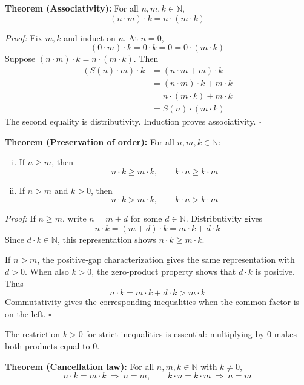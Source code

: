 \documentclass[a4paper,11pt,abstracton]{scrartcl}
\newcommand{\NN}{\mathbb{N}}
\newcommand{\rimply}{\Rightarrow}
\theoremstyle{dotlessP}
\theoremstyle{dotlessS}
\theoremstyle{remark}
\theoremstyle{definition}
\begin{document}
\begin{problem_box}
\textbf{Theorem (Associativity):}
For all $n,m,k\in\NN$,
\[
    (n\cdot m)\cdot k=n\cdot(m\cdot k)
\]
\end{problem_box}

\begin{claim_box}
\textit{Proof:}
Fix $m,k$ and induct on $n$. At $n=0$,
\[
    (0\cdot m)\cdot k=0\cdot k=0=0\cdot(m\cdot k)
\]
Suppose $(n\cdot m)\cdot k=n\cdot(m\cdot k)$. Then
\[
\begin{aligned}
    (S(n)\cdot m)\cdot k
    &=(n\cdot m+m)\cdot k\\
    &=(n\cdot m)\cdot k+m\cdot k\\
    &=n\cdot(m\cdot k)+m\cdot k\\
    &=S(n)\cdot(m\cdot k)
\end{aligned}
\]
The second equality is distributivity. Induction proves associativity.
\hfill$\square$
\end{claim_box}

\begin{problem_box}
\textbf{Theorem (Preservation of order):}
For all $n,m,k\in\NN$:
\begin{enumerate}[(i)]
    \item If $n\ge m$, then
    \[
        n\cdot k\ge m\cdot k,
        \qquad k\cdot n\ge k\cdot m
    \]
    \item If $n>m$ and $k>0$, then
    \[
        n\cdot k>m\cdot k,
        \qquad k\cdot n>k\cdot m
    \]
\end{enumerate}
\end{problem_box}

\begin{claim_box}
\textit{Proof:}
If $n\ge m$, write $n=m+d$ for some $d\in\NN$. Distributivity gives
\[
    n\cdot k=(m+d)\cdot k=m\cdot k+d\cdot k
\]
Since $d\cdot k\in\NN$, this representation shows
$n\cdot k\ge m\cdot k$.

If $n>m$, the positive-gap characterization gives the same
representation with $d>0$. When also $k>0$, the zero-product property
shows that $d\cdot k$ is positive. Thus
\[
    n\cdot k=m\cdot k+d\cdot k>m\cdot k
\]
Commutativity gives the corresponding inequalities when the common
factor is on the left.
\hfill$\square$
\end{claim_box}

The restriction $k>0$ for strict inequalities is essential: multiplying
by $0$ makes both products equal to $0$.

\begin{problem_box}
\textbf{Theorem (Cancellation law):}
For all $n,m,k\in\NN$ with $k\ne0$,
\[
    n\cdot k=m\cdot k\ \rimply\ n=m,
    \qquad k\cdot n=k\cdot m\ \rimply\ n=m
\]
\end{problem_box}
\end{document}
